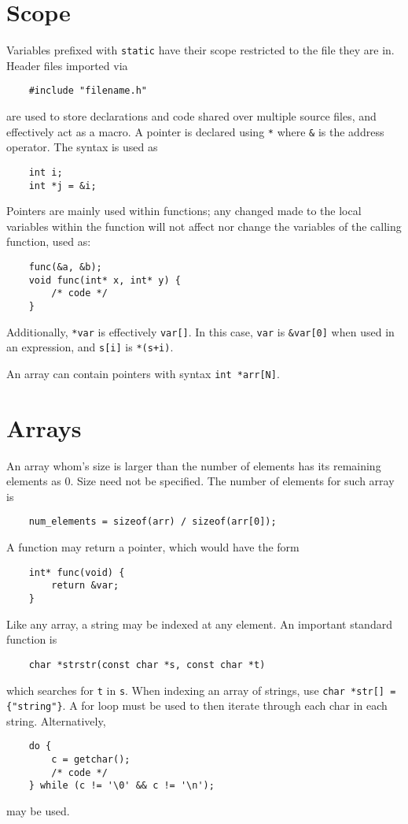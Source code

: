 \documentclass{tufte-book}
\begin{document}
\section{Scope}

Variables prefixed with \lstinline{static} have their scope restricted to the file they are in. Header files imported via
\begin{lstlisting}
    #include "filename.h"
\end{lstlisting}
are used to store declarations and code shared over multiple source files, and effectively act as a macro. A pointer is declared using \lstinline{*} where \lstinline{&} is the address operator. The syntax is used as
\begin{lstlisting}
    int i;
    int *j = &i;
\end{lstlisting}
Pointers are mainly used within functions; any changed made to the local variables within the function will not affect nor change the variables of the calling function, used as:
\begin{lstlisting}
    func(&a, &b);
    void func(int* x, int* y) {
        /* code */
    }
\end{lstlisting}
Additionally, \lstinline{*var} is effectively \lstinline{var[]}. In this case, \lstinline{var} is \lstinline{&var[0]} when used in an expression, and \lstinline{s[i]} is \lstinline{*(s+i)}.

\bigskip
An array can contain pointers with syntax \lstinline{int *arr[N]}.

\section{Arrays}
An array whom's size is larger than the number of elements has its remaining elements as 0. Size need not be specified. The number of elements for such array is
\begin{lstlisting}
    num_elements = sizeof(arr) / sizeof(arr[0]);
\end{lstlisting}
A function may return a pointer, which would have the form
\begin{lstlisting}
    int* func(void) {
        return &var;
    }
\end{lstlisting}
Like any array, a string may be indexed at any element. An important standard function is
\begin{lstlisting}
    char *strstr(const char *s, const char *t)
\end{lstlisting}
which searches for \verb|t| in \verb|s|. When indexing an array of strings, use \lstinline|char *str[] = {"string"}|. A for loop must be used to then iterate through each char in each string. Alternatively,
\begin{lstlisting}
    do {
        c = getchar();
        /* code */
    } while (c != '\0' && c != '\n');
\end{lstlisting}
may be used.
\end{document}
